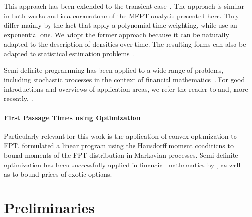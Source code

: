 This approach has been extended to the transient
case~\cite{dowdy2018dynamic,sakurai2019bounding}.
The approach is similar in both works and is a cornerstone of the \ac{MFPT} analysis
presented here.
They differ mainly by the fact that \citet{sakurai2019bounding} apply a polynomial
time-weighting, while \citet{dowdy2018dynamic} use an
exponential one. We adopt the former approach because it
can be naturally adapted to the description of densities over time.
The resulting forms can also be adapted to statistical estimation
problems~\cite{backenkohler2019control}.

Semi-definite programming has been applied to a wide range of problems,
including stochastic processes in the context of financial
mathematics~\cite{lasserre2006pricing,kashima2009polynomial}.
For good introductions and overviews of application areas, we refer
the reader to \citet{parrilo2003semidefinite} and, more recently,
\citet{lasserre2010moments}.

\paragraph{First Passage Times using Optimization}
Particularly relevant for this work is the application of convex optimization to
\ac{FPT}.
\citet{helmes2001computing} formulated a linear program using the
Hausdorff moment conditions to bound moments of the
\ac{FPT} distribution in Markovian processes.
Semi-definite optimization has been successfully applied in financial
mathematics by \citet{kashima2009polynomial}, as well as
\citet{lasserre2006pricing} to bound prices of exotic options.

\section{Preliminaries}\label{sec:mfpt:bg}



